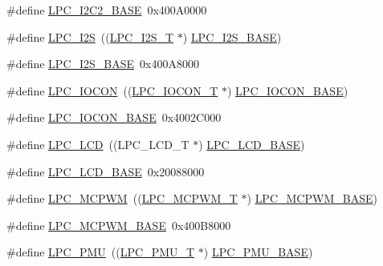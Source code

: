 \begin{DoxyCompactItemize}
\item 
\#define \hyperlink{group__PERIPH__177X__8X__BASE_ga00796bd1f1fa200bbffcd9e7e8679eaa}{L\+P\+C\+\_\+\+I2\+C2\+\_\+\+B\+A\+SE}~0x400\+A0000
\item 
\#define \hyperlink{group__PERIPH__177X__8X__BASE_ga1d2800cab1a50bdf99efe66d6028b663}{L\+P\+C\+\_\+\+I2S}~((\hyperlink{structLPC__I2S__T}{L\+P\+C\+\_\+\+I2\+S\+\_\+T}              $\ast$) \hyperlink{group__PERIPH__407X__8X__BASE_gacff8b54e3924910d381e6b8ba804050c}{L\+P\+C\+\_\+\+I2\+S\+\_\+\+B\+A\+SE})
\item 
\#define \hyperlink{group__PERIPH__177X__8X__BASE_gacff8b54e3924910d381e6b8ba804050c}{L\+P\+C\+\_\+\+I2\+S\+\_\+\+B\+A\+SE}~0x400\+A8000
\item 
\#define \hyperlink{group__PERIPH__177X__8X__BASE_gaabc651799ba17b0dd4a0114c8d48a145}{L\+P\+C\+\_\+\+I\+O\+C\+ON}~((\hyperlink{structLPC__IOCON__T}{L\+P\+C\+\_\+\+I\+O\+C\+O\+N\+\_\+T}            $\ast$) \hyperlink{group__PERIPH__407X__8X__BASE_gae48aea115d5924805263d7a15402d4fa}{L\+P\+C\+\_\+\+I\+O\+C\+O\+N\+\_\+\+B\+A\+SE})
\item 
\#define \hyperlink{group__PERIPH__177X__8X__BASE_gae48aea115d5924805263d7a15402d4fa}{L\+P\+C\+\_\+\+I\+O\+C\+O\+N\+\_\+\+B\+A\+SE}~0x4002\+C000
\item 
\#define \hyperlink{group__PERIPH__177X__8X__BASE_ga68cb24e38b29356c45f9bb634b35c677}{L\+P\+C\+\_\+\+L\+CD}~((L\+P\+C\+\_\+\+L\+C\+D\+\_\+T              $\ast$) \hyperlink{group__PERIPH__407X__8X__BASE_gae1746cd618a1eb4f24f95255594f159a}{L\+P\+C\+\_\+\+L\+C\+D\+\_\+\+B\+A\+SE})
\item 
\#define \hyperlink{group__PERIPH__177X__8X__BASE_gae1746cd618a1eb4f24f95255594f159a}{L\+P\+C\+\_\+\+L\+C\+D\+\_\+\+B\+A\+SE}~0x20088000
\item 
\#define \hyperlink{group__PERIPH__177X__8X__BASE_ga6fe8e415821195a786b3f0dc5e7fc9fa}{L\+P\+C\+\_\+\+M\+C\+P\+WM}~((\hyperlink{structLPC__MCPWM__T}{L\+P\+C\+\_\+\+M\+C\+P\+W\+M\+\_\+T}            $\ast$) \hyperlink{group__PERIPH__407X__8X__BASE_gad8a41dc802e3ea0ba9457d42a6927c03}{L\+P\+C\+\_\+\+M\+C\+P\+W\+M\+\_\+\+B\+A\+SE})
\item 
\#define \hyperlink{group__PERIPH__177X__8X__BASE_gad8a41dc802e3ea0ba9457d42a6927c03}{L\+P\+C\+\_\+\+M\+C\+P\+W\+M\+\_\+\+B\+A\+SE}~0x400\+B8000
\item 
\#define \hyperlink{group__PERIPH__177X__8X__BASE_ga9d540cc313db00679c10f9ac1961b06a}{L\+P\+C\+\_\+\+P\+MU}~((\hyperlink{structLPC__PMU__T}{L\+P\+C\+\_\+\+P\+M\+U\+\_\+T}              $\ast$) \hyperlink{group__PERIPH__407X__8X__BASE_ga865bed8ad61e9e273439ad1349a46d68}{L\+P\+C\+\_\+\+P\+M\+U\+\_\+\+B\+A\+SE})

\end{DoxyCompactItemize}
